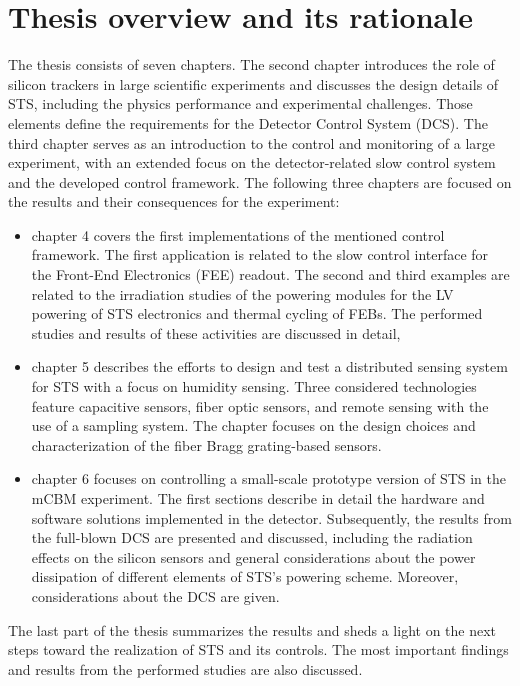 \section{Thesis overview and its rationale}
The thesis consists of seven chapters. The second chapter introduces the role of silicon trackers in large scientific experiments and discusses the design details of \gls{STS}, including the physics performance and experimental challenges. Those elements define the requirements for the Detector Control System (\gls{DCS}). The third chapter serves as an introduction to the control and monitoring of a large experiment, with an extended focus on the detector-related slow control system and the developed control framework. The following three chapters are focused on the results and their consequences for the experiment:
\begin{itemize}
    \item chapter 4 covers the first implementations of the mentioned control framework. The first application is related to the slow control interface for the Front-End Electronics (\gls{FEE}) readout. The second and third examples are related to the irradiation studies of the powering modules for the \gls{LV} powering of \gls{STS} electronics and thermal cycling of \glspl{FEB}. The performed studies and results of these activities are discussed in detail,
    \item chapter 5 describes the efforts to design and test a distributed sensing system for \gls{STS} with a focus on humidity sensing. Three considered technologies feature capacitive sensors, fiber optic sensors, and remote sensing with the use of a sampling system. The chapter focuses on the design choices and characterization of the fiber Bragg grating-based sensors. 
    \item chapter 6 focuses on controlling a small-scale prototype version of \gls{STS} in the \gls{mCBM} experiment. The first sections describe in detail the hardware and software solutions implemented in the detector. Subsequently, the results from the full-blown \gls{DCS} are presented and discussed, including the radiation effects on the silicon sensors and general considerations about the power dissipation of different elements of \gls{STS}'s powering scheme. Moreover, considerations about the \gls{DCS} are given. 
\end{itemize}
The last part of the thesis summarizes the results and sheds a light on the next steps toward the realization of \gls{STS} and its controls. The most important findings and results from the performed studies are also discussed.